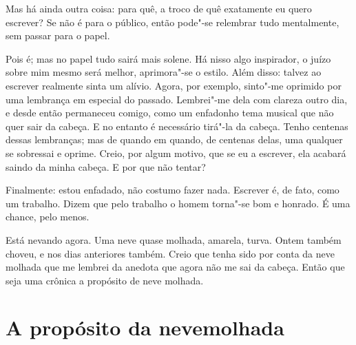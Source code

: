 Mas há ainda outra coisa: para quê, a troco de quê exatamente eu quero
escrever? Se não é para o público, então pode"-se relembrar tudo
mentalmente, sem passar para o papel.

Pois é; mas no papel tudo sairá mais solene. Há nisso algo inspirador, o
juízo sobre mim mesmo será melhor, aprimora"-se o estilo. Além disso:
talvez ao escrever realmente sinta um alívio. Agora, por exemplo,
sinto"-me oprimido por uma lembrança em especial do passado. Lembrei"-me
dela com clareza outro dia, e desde então permaneceu comigo, como um
enfadonho tema musical que não quer sair da cabeça. E no entanto é
necessário tirá"-la da cabeça. Tenho centenas dessas lembranças; mas de
quando em quando, de centenas delas, uma qualquer se sobressai e
oprime. Creio, por algum motivo, que se eu a escrever, ela acabará
saindo da minha cabeça. E por que não tentar?

Finalmente: estou enfadado, não costumo fazer nada. Escrever é, de fato,
como um trabalho. Dizem que pelo trabalho o homem torna"-se bom e
honrado. É uma chance, pelo menos.

Está nevando agora. Uma neve quase molhada, amarela, turva. Ontem também
choveu, e nos dias anteriores também. Creio que tenha sido por conta da
neve molhada que me lembrei da anedota que agora não me sai da cabeça.
Então que seja uma crônica a propósito de neve molhada.

\chapter[A propósito da neve molhada]{A propósito da neve\break molhada}





